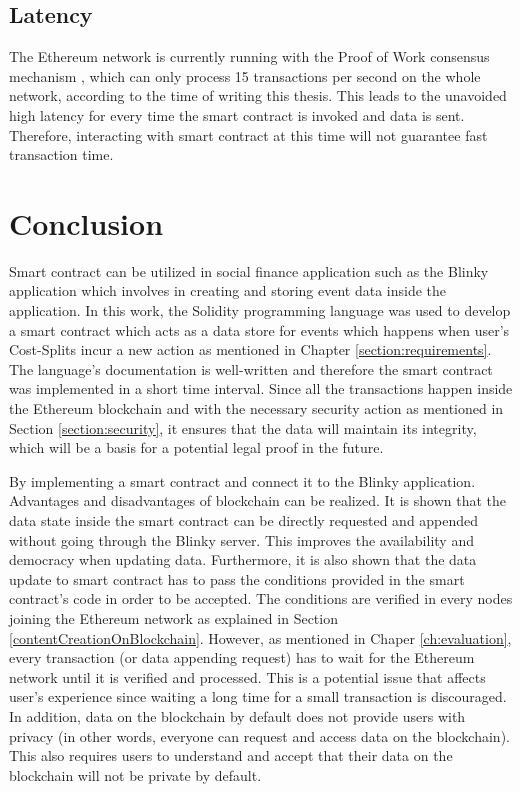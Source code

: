 \documentclass[twoside,numperchapter]{tutthesis} %
\begin{document}
\section{Latency}

The Ethereum network is currently running with the Proof of Work consensus mechanism \citep{RefWorks:doc:BitcoinWhitepaper}, which can only process 15 transactions per second on the whole network, according to the time of writing this thesis. This leads to the unavoided high latency for every time the smart contract is invoked and data is sent. Therefore, interacting with smart contract at this time will not guarantee fast transaction time.

\chapter{Conclusion}
\label{ch:conclusion}

Smart contract can be utilized in social finance application such as the Blinky application which involves in creating and storing event data inside the application. In this work, the Solidity programming language was used to develop a smart contract which acts as a data store for events which happens when user's Cost-Splits incur a new action as mentioned in Chapter \ref{section:requirements}. The language's documentation is well-written and therefore the smart contract was implemented in a short time interval. Since all the transactions happen inside the Ethereum blockchain and with the necessary security action as mentioned in Section \ref{section:security}, it ensures that the data will maintain its integrity, which will be a basis for a potential legal proof in the future.

By implementing a smart contract and connect it to the Blinky application. Advantages and disadvantages of blockchain can be realized. It is shown that the data state inside the smart contract can be directly requested and appended without going through the Blinky server. This improves the availability and democracy when updating data. Furthermore, it is also shown that the data update to smart contract has to pass the conditions provided in the smart contract's code in order to be accepted. The conditions are verified in every nodes joining the Ethereum network as explained in Section \ref{contentCreationOnBlockchain}. However, as mentioned in Chaper \ref{ch:evaluation}, every transaction (or data appending request) has to wait for the Ethereum network until it is verified and processed. This is a potential issue that affects user's experience since waiting a long time for a small transaction is discouraged. In addition, data on the blockchain by default does not provide users with privacy (in other words, everyone can request and access data on the blockchain). This also requires users to understand and accept that their data on the blockchain will not be private by default.
\end{document}
